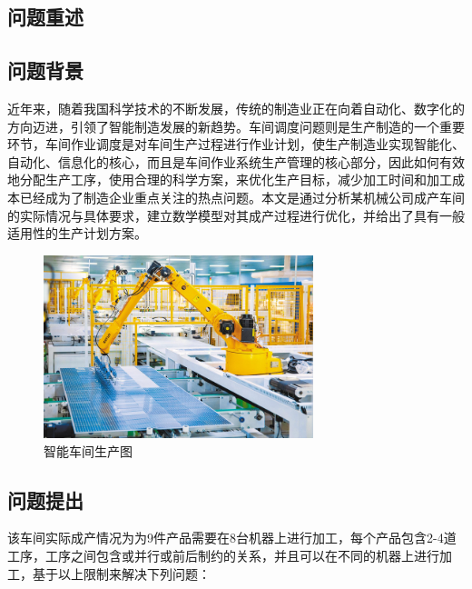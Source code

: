 \documentclass{whutmod}
\begin{document}
\begin{spacing}{1.2}
\begin{abstract}
		

		
	\end{abstract}

    \thispagestyle{empty}
	\tableofcontents
	\thispagestyle{empty}

	\newpage
	\setcounter{page}{1}

	\section{问题重述}
    


	\subsection{问题背景}

    近年来，随着我国科学技术的不断发展，传统的制造业正在向着自动化、数字化的方向迈进，引领了智能制造发展的新趋势。车间调度问题则是生产制造的一个重要环节，车间作业调度是对车间生产过程进行作业计划，使生产制造业实现智能化、自动化、信息化的核心，而且是车间作业系统生产管理的核心部分，因此如何有效地分配生产工序，使用合理的科学方案，来优化生产目标，减少加工时间和加工成本已经成为了制造企业重点关注的热点问题。本文是通过分析某机械公司成产车间的实际情况与具体要求，建立数学模型对其成产过程进行优化，并给出了具有一般适用性的生产计划方案。
    	\begin{figure}[H]
        \centering
        \includegraphics[width=0.7\textwidth]{智能车间生产图.png}
        \caption{智能车间生产图}
    \end{figure}


	\subsection{问题提出}
   该车间实际成产情况为为9件产品需要在8台机器上进行加工，每个产品包含2-4道工序，工序之间包含或并行或前后制约的关系，并且可以在不同的机器上进行加工，基于以上限制来解决下列问题：
    

\end{spacing}
\end{document}
